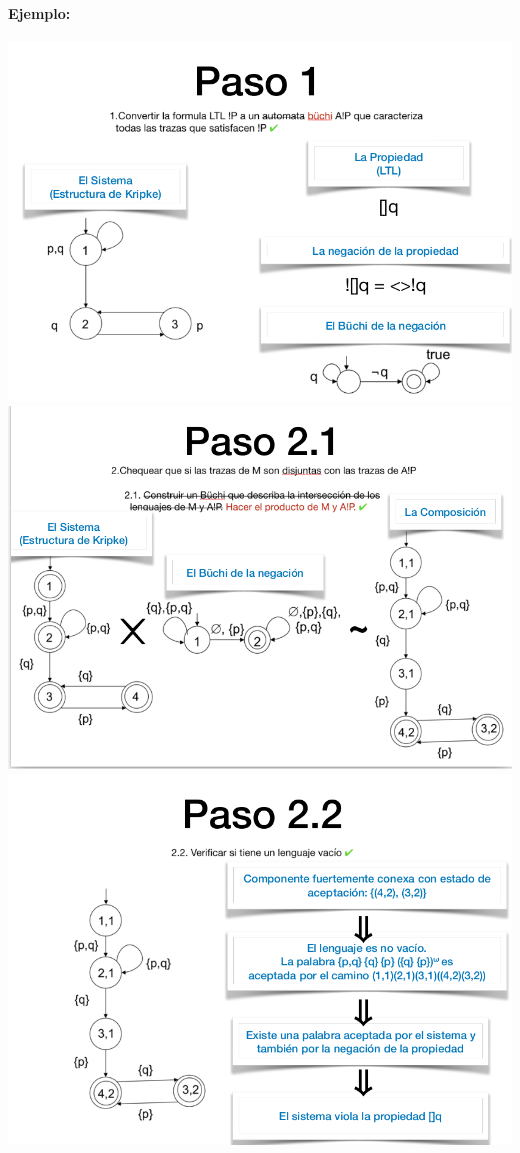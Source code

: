 \paragraph{Ejemplo:}
\begin{center}
    \includegraphics[scale=0.375]{imagenes/paso1.png}
    \includegraphics[scale=0.375]{imagenes/paso2.png}
    \includegraphics[scale=0.375]{imagenes/paso2-2.png}
\end{center}
